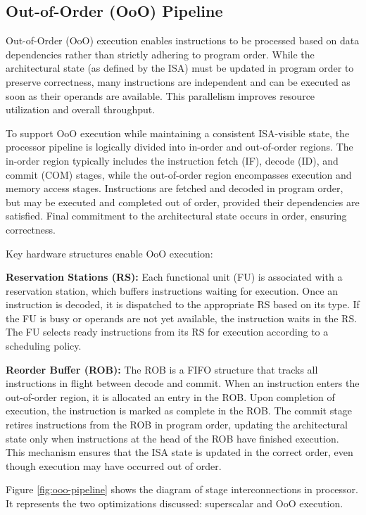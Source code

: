 \subsection{Out-of-Order (OoO) Pipeline}
Out-of-Order (OoO) execution enables instructions to be processed based on data dependencies rather than strictly adhering to program order. While the architectural state (as defined by the ISA) must be updated in program order to preserve correctness, many instructions are independent and can be executed as soon as their operands are available. This parallelism improves resource utilization and overall throughput.

To support OoO execution while maintaining a consistent ISA-visible state, the processor pipeline is logically divided into in-order and out-of-order regions. The in-order region typically includes the instruction fetch (IF), decode (ID), and commit (COM) stages, while the out-of-order region encompasses execution and memory access stages. Instructions are fetched and decoded in program order, but may be executed and completed out of order, provided their dependencies are satisfied. Final commitment to the architectural state occurs in order, ensuring correctness.

Key hardware structures enable OoO execution:

\textbf{Reservation Stations (RS):} Each functional unit (FU) is associated with a reservation station, which buffers instructions waiting for execution. Once an instruction is decoded, it is dispatched to the appropriate RS based on its type. If the FU is busy or operands are not yet available, the instruction waits in the RS. The FU selects ready instructions from its RS for execution according to a scheduling policy.

\textbf{Reorder Buffer (ROB):} The ROB is a FIFO structure that tracks all instructions in flight between decode and commit. When an instruction enters the out-of-order region, it is allocated an entry in the ROB. Upon completion of execution, the instruction is marked as complete in the ROB. The commit stage retires instructions from the ROB in program order, updating the architectural state only when instructions at the head of the ROB have finished execution. This mechanism ensures that the ISA state is updated in the correct order, even though execution may have occurred out of order.

Figure \ref{fig:ooo-pipeline} shows the diagram of stage interconnections in processor. It represents the two optimizations discussed: superscalar and OoO execution.

